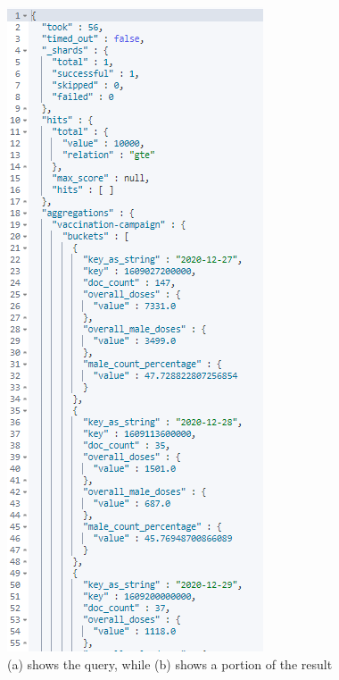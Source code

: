 \documentclass{article}[IEEEtran]
\begin{document}
\begin{figure}[H]
\begin{center}
\begin{minipage}[b]{0.4\textwidth}
    \includegraphics[width=\textwidth, frame]{Answer_Query_4.PNG}
     \subcaption{}
  \end{minipage}
  \caption{(a) shows the query, while (b) shows a portion of the result}
\end{center}
\end{figure}
\end{document}
